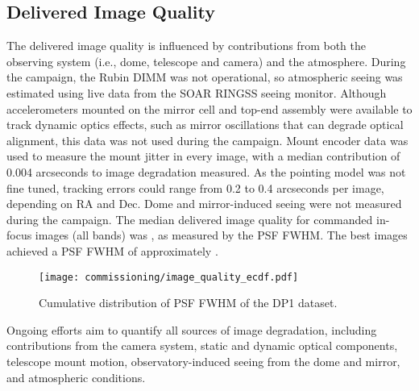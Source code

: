 
\subsection{Delivered Image Quality
\label{ssec:image_quality}}
The delivered image quality is influenced by contributions from both the observing system (i.e., dome, telescope and \gls{camera}) and the atmosphere.
During the campaign, the Rubin \gls{DIMM} was not operational, so atmospheric seeing was estimated using live data from the \gls{SOAR} \gls{RINGSS} seeing monitor.
Although accelerometers mounted on the mirror cell and top-end assembly were available to track dynamic optics effects, such as mirror oscillations that can degrade optical alignment, this data was not used during the campaign.
Mount encoder data was used to measure the mount jitter in every image, with a median contribution of 0.004 arcseconds to image degradation measured.
As the pointing model was not fine tuned, tracking errors could range from 0.2 to 0.4 arcseconds per image, depending on RA and Dec.
Dome and mirror-induced \gls{seeing} were not measured during the campaign.
% 
The median delivered image quality for commanded in-focus images (all bands) was \medianimagequalityallbands, as measured by the \gls{PSF} \gls{FWHM}.
The best images achieved a \gls{PSF} \gls{FWHM} of approximately \bestimagequality.
\begin{figure}[htb!]
\centering
\texttt{[image: commissioning/image\_quality\_ecdf.pdf]}
\caption{Cumulative distribution of \gls{PSF} \gls{FWHM} of the \gls{DP1} dataset.}
\label{fig:delivered_image_quality_ecdf}
\end{figure}
Ongoing efforts aim to quantify all sources of image degradation,  including contributions from the \gls{camera} system, static and dynamic optical components, telescope mount motion,  observatory-induced seeing from the dome and mirror, and atmospheric conditions.
